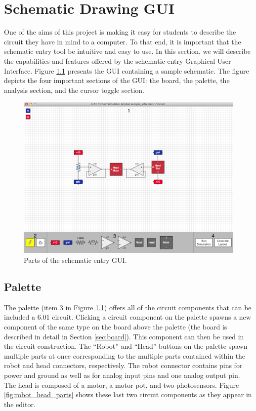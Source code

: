 
\chapter{Schematic Drawing GUI}
\label{app:gui}

One of the aims of this project is making it easy for students to describe the
circuit they have in mind to a computer. To that end, it is important that the
schematic entry tool be intuitive and easy to use. In this section, we will
describe the capabilities and features offered by the schematic entry Graphical
User Interface. Figure \ref{fig:gui} presents the GUI containing a sample
schematic. The figure depicts the four important sections of the GUI: the board,
the palette, the analysis section, and the cursor toggle section.

\begin{figure}
\begin{center}
\includegraphics[width=\textwidth]{Images/gui.png}
\caption{Parts of the schematic entry GUI.}
\label{fig:gui}
\end{center}
\end{figure}

\section{Palette}

The palette (item $3$ in Figure \ref{fig:gui}) offers all of the circuit
components that can be included a 6.01 circuit. Clicking a circuit component on
the palette spawns a new component of the same type on the board above
the palette (the board is described in detail in Section \ref{sec:board}).
This component can then be used in the circuit construction. The
``Robot'' and ``Head'' buttons on the palette spawn multiple parts at once
corresponding to the multiple parts contained within the robot and head
connectors, respectively. The robot
connector contains pins for power and ground as well as for analog input pins
and one analog output pin. The head is composed of a motor, a motor pot, and
two photosensors. Figure \ref{fig:robot_head_parts} shows these last two
circuit components as they appear in the editor.

